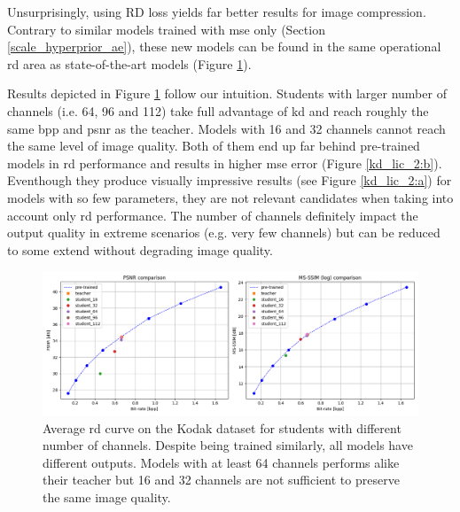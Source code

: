 Unsurprisingly, using \acrshort{RD} loss yields far better results for image compression. Contrary to similar models trained with \acrshort{mse} only (Section \ref{scale_hyperprior_ae}), these new models can be found in the same operational \acrshort{rd} area as state-of-the-art models (Figure \ref{kd_lic_1}).

Results depicted in Figure \ref{kd_lic_1} follow our intuition. Students with larger number of channels (i.e. 64, 96 and 112) take full advantage of \acrshort{kd} and reach roughly the same \acrshort{bpp} and \acrshort{psnr} as the teacher. Models with 16 and 32 channels cannot reach the same level of image quality. Both of them end up far behind pre-trained models in \acrshort{rd} performance and results in higher \acrshort{mse} error (Figure \ref{kd_lic_2:b}). Eventhough they produce visually impressive results (see Figure \ref{kd_lic_2:a}) for models with so few parameters, they are not relevant candidates when taking into account only \acrshort{rd} performance. The number of channels definitely impact the output quality in extreme scenarios (e.g. very few channels) but can be reduced to some extend without degrading image quality.

\begin{figure}
    \centering
    \includegraphics[width=15cm]{img/kd_lic_rd_channels.png}
    \caption[Average \acrshort{rd} curve on the Kodak dataset for students with different number of channels.]{Average \acrshort{rd} curve on the Kodak dataset for students with different number of channels. Despite being trained similarly, all models have different outputs. Models with at least 64 channels performs alike their teacher but 16 and 32 channels are not sufficient to preserve the same image quality.}
    \label{kd_lic_1}
\end{figure}

